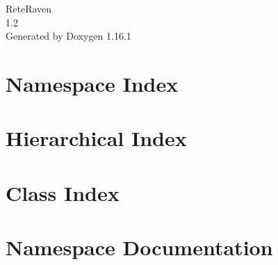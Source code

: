 \documentclass[twoside]{book}
\newcommand{\+}{\discretionary{\mbox{\scriptsize$\hookleftarrow$}}{}{}}
\newcommand{\clearemptydoublepage}{%
    \newpage{\pagestyle{empty}\cleardoublepage}%
  }
\begin{document}
  \raggedbottom
    \hypersetup{pageanchor=false,
                bookmarksnumbered=true,
                pdfencoding=unicode
               }
  \begin{titlepage}
  \vspace*{7cm}
  \begin{center}%
  {\Large Rete\+Raven}\\
  [1ex]\large 1.\+2 \\
  \vspace*{1cm}
  {\large Generated by Doxygen 1.16.1}\\
  \end{center}
  \end{titlepage}
  \clearemptydoublepage
  \tableofcontents
  \clearemptydoublepage
  \hypersetup{pageanchor=true}
\chapter{Namespace Index}

\chapter{Hierarchical Index}

\chapter{Class Index}

\chapter{Namespace Documentation}



\end{document}
